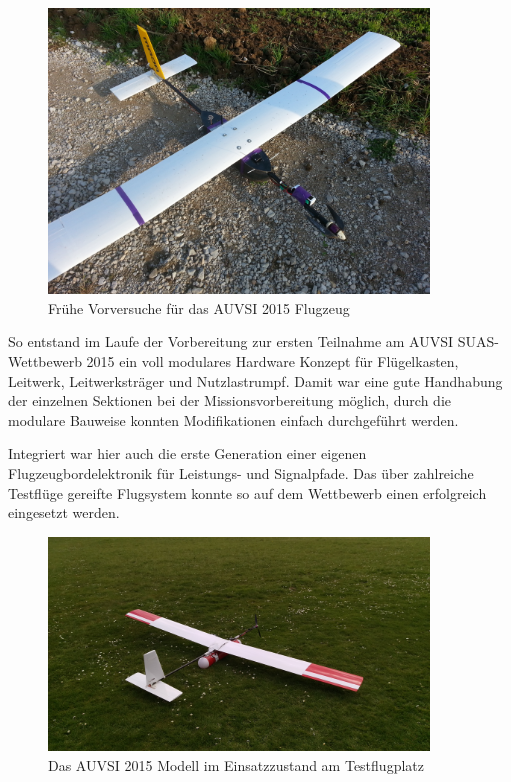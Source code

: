 \begin{figure}[H]
\centering
\includegraphics[width=0.9\textwidth]{bilder/Fotos/AUVSI-MAYA-Hybrid.jpg} 
\caption{Frühe Vorversuche für das AUVSI 2015 Flugzeug} 
\label{Frühe Vorversuche für das AUVSI 2015 Flugzeug}
\end{figure}

So entstand im Laufe der Vorbereitung zur ersten Teilnahme am AUVSI SUAS-Wettbewerb 2015 ein voll modulares Hardware Konzept für Flügelkasten, Leitwerk, Leitwerksträger und Nutzlastrumpf. Damit war eine gute Handhabung der einzelnen Sektionen bei der Missionsvorbereitung möglich, durch die modulare Bauweise konnten Modifikationen einfach durchgeführt werden.

Integriert war hier auch die erste Generation einer eigenen Flugzeugbordelektronik für Leistungs- und Signalpfade. Das über zahlreiche Testflüge gereifte Flugsystem konnte so auf dem Wettbewerb einen erfolgreich eingesetzt werden.
\clearpage

\begin{figure}[H]
\centering
\includegraphics[width=0.9\textwidth]{bilder/Fotos/AUVSI_2015.jpg} 
\caption{Das AUVSI 2015 Modell im Einsatzzustand am Testflugplatz} 
\label{Das AUVSI 2015 Modell in Einsatzzustand am Testflugplatz}
\end{figure}

